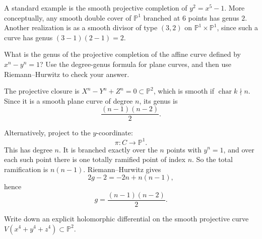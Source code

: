 \documentclass[12pt]{article}
\begin{document}
\begin{solution}
    A standard example is the smooth projective completion of $y^2=x^5-1$. More conceptually, any smooth double cover of $\mathbb{P}^1$ branched at $6$ points has genus $2$. Another realization is as a smooth divisor of type $(3,2)$ on $\mathbb{P}^1\times \mathbb{P}^1$, since such a curve has genus $(3-1)(2-1)=2$.
\end{solution}

\begin{exercise}
    What is the genus of the projective completion of the affine curve defined by $x^n - y^n = 1$? Use the degree-genus formula for plane curves, and then use Riemann--Hurwitz to check your answer.
\end{exercise}

\begin{solution}
    The projective closure is $X^n - Y^n + Z^n = 0 \subset \mathbb{P}^2$,
    which is smooth if $\operatorname{char} k \nmid n$. Since it is a smooth plane curve of degree $n$, its genus is
    \[
        \frac{(n-1)(n-2)}{2}.
    \]

    Alternatively, project to the $y$-coordinate:
    \[
        \pi : C \to \mathbb{P}^1.
    \]
    This has degree $n$. It is branched exactly over the $n$ points with $y^n = 1$, and over each such point there is one totally ramified point of index $n$. So the total ramification is $n(n-1)$. Riemann--Hurwitz gives
    \[
        2g - 2 = -2n + n(n-1),
    \]
    hence
    \[
        g = \frac{(n-1)(n-2)}{2}.
    \]
\end{solution}

\begin{exercise}
    Write down an explicit holomorphic differential on the smooth projective curve $V(x^4 + y^4 + z^4) \subset \mathbb{P}^2$.
\end{exercise}
\end{document}
